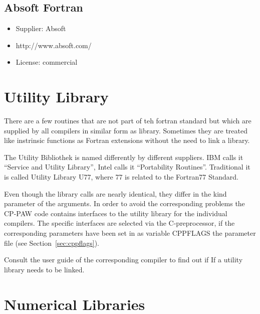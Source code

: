 \documentclass[a4paper,10pt]{report}
\begin{document}
\subsection{Absoft Fortran}
\begin{itemize}
\item Supplier: Absoft
\item http://www.absoft.com/
\item License: commercial
\end{itemize}


\section{Utility Library}
\label{sec:utility}
There are a few routines that are not part of teh fortran standard but
which are supplied by all compilers in similar form as
library. Sometimes they are treated like instrinsic functions as
Fortran extensions without the need to link a library.

The Utility Bibliothek is named differently by different
suppliers. IBM calls it ``Service and Utility Library'', Intel calls
it ``Portability Routines''. Traditional it is called Utility Library
U77, where 77 is related to the Fortran77 Standard.

Even though the library calls are nearly identical, they differ in the
kind parameter of the arguments. In order to avoid the corresponding
problems the CP-PAW code contains interfaces to the utility library
for the individual compilers. The specific interfaces are selected via
the C-preprocessor, if the corresponding parameters have been set in
as variable CPPFLAGS the parameter file (see Section~\ref{sec:cppflags}).

Consult the user guide of the corresponding compiler to find out if
If a utility library needs to be linked.

\newpage
\section{Numerical Libraries}
\label{sec:libs}
\end{document}
